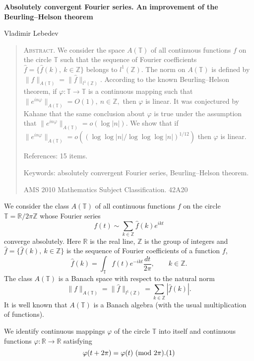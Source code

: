 \documentclass[12pt]{article}
\begin{document}
\begin{center}
\textbf{\large Absolutely convergent Fourier series. An
improvement of the Beurling--Helson theorem}
\end{center}

\begin{center}
Vladimir Lebedev
\end{center}

\begin{quotation}
{\small \textsc{Abstract.} We consider the space $A(\mathbb T)$ of
all continuous functions $f$ on the circle $\mathbb T$ such that
the sequence of Fourier coefficients
$\widehat{f}=\{\widehat{f}(k), ~k \in \mathbb Z\}$ belongs to
$l^1(\mathbb Z)$. The norm on $A(\mathbb T)$ is defined by
$\|f\|_{A(\mathbb T)}=\|\widehat{f}\|_{l^1(\mathbb Z)}$. According
to the known Beurling--Helson theorem, if $\varphi : \mathbb
T\rightarrow\mathbb T$ is a continuous mapping such that
$\|e^{in\varphi}\|_{A(\mathbb T)}=O(1), ~n\in\mathbb Z,$ then
$\varphi$ is linear. It was conjectured by Kahane that the same
conclusion about $\varphi$ is true under the assumption that
$\|e^{in\varphi}\|_{A(\mathbb T)}=o(\log |n|)$. We show that if
$\|e^{in\varphi}\|_{A(\mathbb T)}=o((\log\log |n|/\log\log\log
|n|)^{1/12})$ then $\varphi$ is linear.

  References: 15 items.

  Keywords: absolutely convergent Fourier series, Beurling--Helson
theorem.

  AMS 2010 Mathematics Subject Classification. 42A20}
\end{quotation}

\quad

   We consider the class $A(\mathbb T)$ of all continuous functions
$f$ on the circle $\mathbb T=\mathbb R/2\pi\mathbb Z$ whose
Fourier series
$$
f(t)\sim \sum_{k\in\mathbb Z}\widehat{f}(k)e^{ikt}
$$
converge absolutely. Here $\mathbb R$ is the real line, $\mathbb
Z$ is the group of integers and $\widehat{f}=\{\widehat{f}(k),
~k\in\mathbb Z\}$ is the sequence of Fourier coefficients of a
function $f$,
$$
\widehat{f}(k)=\int_{\mathbb T} f(t)e^{-ikt}\frac{dt}{2\pi},
\qquad k\in\mathbb Z.
$$
The class $A(\mathbb T)$ is a Banach space with respect to the
natural norm
$$
\|f\|_{A(\mathbb T)}=\|\widehat{f}\|_{l^1(\mathbb Z)}=
\sum_{k\in\mathbb Z}|\widehat{f}(k)|.
$$
It is well known that $A(\mathbb T)$ is a Banach algebra (with the
usual multiplication of functions).

  We identify continuous mappings $\varphi$ of the circle
$\mathbb T$ into itself and continuous functions $\varphi :
\mathbb R\rightarrow\mathbb R$ satisfying
$$
\varphi(t+2\pi)=\varphi(t)~(\mathrm{mod}~2\pi).
\relax(1)
$$
\end{document}
